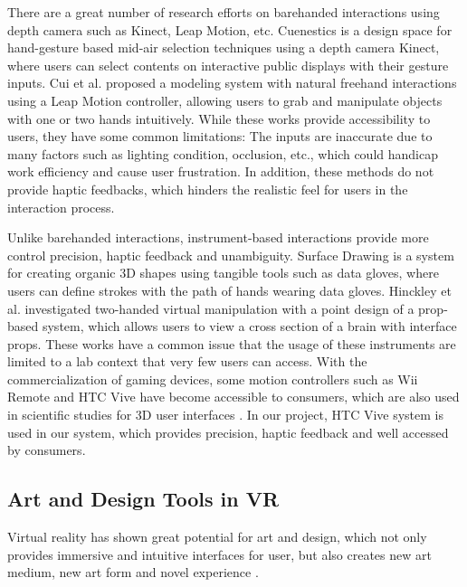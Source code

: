 \documentclass{svjour3}                     %
\begin{document}
There are a great number of research efforts \cite{walter2014cuenesics,cui2016exploration,ramani2015gesture,murugappan2013handy,han2014virtual} on barehanded interactions using depth camera such as Kinect, Leap Motion, etc.
Cuenestics \cite{walter2014cuenesics} is a design space for hand-gesture based mid-air selection techniques using a depth camera Kinect, where users can select contents on interactive public displays with their gesture inputs.
Cui et al. \cite{cui2016exploration} proposed a modeling system with natural freehand interactions using a Leap Motion controller, allowing users to grab and manipulate objects with one or two hands intuitively.
While these works provide accessibility to users, they have some common limitations: The inputs are inaccurate due to many factors such as lighting condition, occlusion, etc., which could handicap work efficiency and cause user frustration.
In addition, these methods do not provide haptic feedbacks, which hinders the realistic feel for users in the interaction process.

Unlike barehanded interactions, instrument-based interactions provide more control precision, haptic feedback and unambiguity.
Surface Drawing \cite{schkolne2001surface} is a system for creating organic 3D shapes using tangible tools such as data gloves, where users can define strokes with the path of hands wearing data gloves.
Hinckley et al. \cite{hinckley1998two} investigated two-handed virtual manipulation with a point design of a prop-based system, which allows users to view a cross section of a brain with interface props.
These works have a common issue that the usage of these instruments are limited to a lab context that very few users can access.
%
With the commercialization of gaming devices, some motion controllers such as Wii Remote and HTC Vive have become accessible to consumers, which are also used in scientific studies for 3D user interfaces \cite{wingcrave2010wii,niehorster2017accuracy}.
%
In our project, HTC Vive system is used in our system, which provides precision, haptic feedback and well accessed by consumers.

\subsection{Art and Design Tools in VR}
\label{sec:2.2}
Virtual reality has shown great potential for art and design, which not only provides immersive and intuitive interfaces for user, but also creates new art medium, new art form and novel experience \cite{laviola20113d}.
\end{document}
